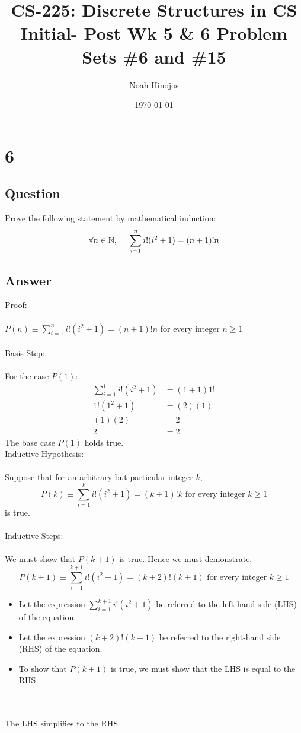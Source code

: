\documentclass[12pt]{article}
\title{
  \textbf{CS-225: Discrete Structures in CS} \\
  Initial- Post Wk 5 \& 6 Problem Sets \#6 and \#15
  }
\author{Noah Hinojos}
\date{\today}
\newcommand{\xlist}[1]{
    \begin{itemize}
        \renewcommand{\labelitemi}{$\centerdot$}
        #1
    \end{itemize}
    \newblock
    \\ \\
}
\newcommand{\xproof}{
    \underline{Proof}:
    \\ \\
}
\newcommand{\xbasistep}{
    \underline{Basis Step}:
    \\ \\
}
\newcommand{\xinductivehypothesis}{
    \underline{Inductive Hypothesis}:
    \\ \\
}
\newcommand{\xinductivesteps}{
    \underline{Inductive Steps}:
    \\ \\
}
\begin{document}
\maketitle
\section*{6}
\subsection*{Question}
Prove the following statement by mathematical induction:
$$ \forall n \in \mathbb{N}\text{,\hspace{0.5cm}}\sum_{i=1}^{n}i!(i^2 + 1) = (n+1)!n$$
\subsection*{Answer}
\xproof
$P(n) \equiv \sum_{i=1}^{n}i!(i^2 + 1) = (n+1)!n$ for every integer $n \geq 1$
\\ \\
\xbasistep
For the case $P(1)$:
\begin{align*}
    \sum_{i=1}^{1}i!(i^2 + 1) &= (1+1)1! \\
    1!(1^2 + 1) &= (2)(1) \\
    (1)(2) &= 2 \\
    2 &= 2
\end{align*}
The base case $P(1)$ holds true.
\newpage
\newblock
\\
\xinductivehypothesis
Suppose that for an arbitrary but particular integer $k$,
\\
$$P(k) \equiv \sum_{i=1}^{k}i!(i^2 + 1) = (k+1)!k\text{ for every integer }k \geq 1$$
is true.
\\ \\
\xinductivesteps
We must show that $P(k+1)$ is true. Hence we must demonstrate,
\\
$$P(k+1) \equiv \sum_{i=1}^{k+1}i!(i^2 + 1) = (k+2)!(k+1)\text{ for every integer }k \geq 1$$
\xlist{
    \item Let the expression $\sum_{i=1}^{k+1}i!(i^2 + 1)$ be referred to the left-hand side (LHS) of the equation.
    \item Let the expression $(k+2)!(k+1)$ be referred to the right-hand side (RHS) of the equation.
    \item To show that $P(k+1)$ is true, we must show that the LHS is equal to the RHS.
}
The LHS simplifies to the RHS
\end{document}
